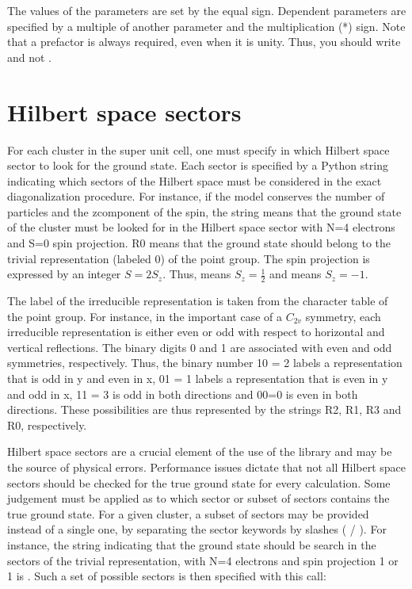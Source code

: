 \documentclass[letterpaper,10pt,english]{sphinxmanual}
\begin{document}
\sphinxAtStartPar
The values of the parameters are set by the equal sign. Dependent parameters are specified by a multiple of another parameter and the multiplication (*) sign. Note that a prefactor is always required, even when it is unity. Thus, you should write  and not .


\section{Hilbert space sectors}
\label{\detokenize{parameters:hilbert-space-sectors}}
\sphinxAtStartPar
For each cluster in the super unit cell, one must specify in which Hilbert space sector to look for the ground state.
Each sector is specified by a Python string indicating  which sectors of the Hilbert space must be considered in the exact diagonalization procedure. For instance, if the model conserves the number of particles and the z\sphinxhyphen{}component of the spin, the string  means that the ground state of the cluster must be looked for in the Hilbert space sector with N=4 electrons and S=0 spin projection. R0 means that the ground state should belong to the trivial representation (labeled 0) of the point group. The spin projection is expressed by an integer \(S = 2 S_z\). Thus,  means \(S_z=\frac12\) and  means \(S_z=-1\).

\sphinxAtStartPar
The label of the irreducible representation is taken from the character table of the point group. For instance, in the important case of a \(C_{2v}\) symmetry, each irreducible representation is either even or odd with respect to horizontal and vertical reflections. The binary digits 0 and 1 are associated with even and odd symmetries, respectively.
Thus, the binary number 10 = 2 labels a representation that is odd in y and even in x, 01 = 1 labels a representation that is even in y and odd in x, 11 = 3 is odd in both directions and 00=0 is even in both directions. These possibilities are thus represented by the strings R2, R1, R3 and R0, respectively.

\sphinxAtStartPar
Hilbert space sectors are a crucial element of the use of the library and may be the source of physical errors. Performance issues dictate that not all Hilbert space sectors should be checked for the true ground state for every calculation. Some judgement must be applied as to which sector or subset of sectors contains the true ground state. For a given cluster, a subset of sectors may be provided instead of a single one, by separating the sector keywords by slashes ( / ). For instance, the string indicating that the ground state should be search in the sectors of the trivial representation, with N=4 electrons and spin projection \sphinxhyphen{}1 or 1 is . Such a set of possible sectors is then specified with this call:
\end{document}
